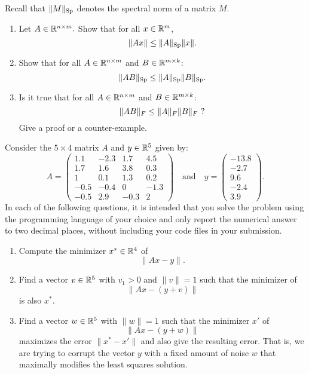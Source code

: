 \documentclass[11pt,nocut]{article}
\begin{document}
\begin{problem}[3 points]
	Recall that $\|M\|_{\rm Sp}$ denotes the spectral norm of a matrix $M$.
	\begin{enumerate}[label=\normalfont(\textbf{\alph*})]
		\item Let $A\in \mathbb{R}^{n \times m}.$ Show that for all $x \in \mathbb{R}^m$,
			$$
			\|Ax\| \leq \|A\|_{\rm Sp} \|x\|.
			$$
		\item Show that for all $A \in \mathbb{R}^{n \times m}$ and $B\in \mathbb{R}^{m \times k}$:
			$$
			\|AB\|_{\rm Sp} \leq \|A\|_{\rm Sp} \|B\|_{\rm Sp}.
			$$
		\item Is it true that for all $A \in \mathbb{R}^{n \times m}$ and $B\in \mathbb{R}^{m \times k}$:
			$$
			\|AB\|_{F} \leq \|A\|_{F} \|B\|_{F} \ {\rm ?}
			$$
			Give a proof or a counter-example.
	\end{enumerate}
\end{problem}

\newpage

\begin{problem}
 Consider the $5 \times 4$ matrix $A$ and $y \in \mathbb{R}^5$ given by:
$$
A=
\begin{pmatrix}
	1.1 & -2.3 & 1.7 &  4.5\\
	1.7  & 1.6  & 3.8  & 0.3 \\
	1  &  0.1 & 1.3&  0.2\\
	-0.5 & -0.4  & 0 &  -1.3 \\
	-0.5  & 2.9 & -0.3 &  2
\end{pmatrix}
\quad \text{and} \quad
y=
\begin{pmatrix}
	-13.8\\
	-2.7 \\
	9.6 \\
	-2.4 \\
	3.9
\end{pmatrix}
.
$$
In each of the following questions, it is intended that you solve the problem using the programming language of your choice and only report the numerical answer to two decimal places, without including your code files in your submission.
\begin{enumerate}[label=\normalfont(\textbf{\alph*})]
	\item Compute the minimizer $x^* \in \mathbb{R}^4$ of 
		$$
		\|Ax-y\|.
		$$
	\item Find a vector $v \in\mathbb{R}^5$ with $v_1 > 0$ and $\|v\|=1$ such that the minimizer of 
		$$
		\|Ax - (y+v)\|
		$$
		is also $x^*$.
	\item Find a vector $w \in \mathbb{R}^5$ with $\|w\|=1$ such that the minimizer $x'$ of 
		$$
		\|Ax - (y+w)\|
		$$
		maximizes the error $\|x^* - x'\|$ and also	give the resulting error.
		That is, we are trying to corrupt the vector $y$ with a fixed amount of noise $w$ that maximally modifies the least squares solution.
\end{enumerate}
\end{problem}
\end{document}
